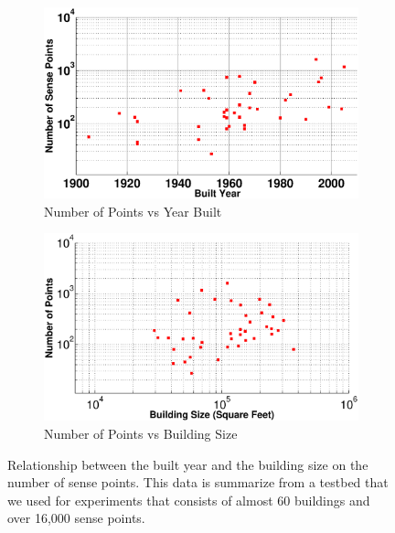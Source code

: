 \begin{figure}[htb!]
\centering
	\begin{subfigure}{0.48\textwidth}
                \centering
		\includegraphics[width=\textwidth]{./figs/pts_vs_yearbuilt.eps}
                \caption{Number of Points vs Year Built}
                \label{fig:sense_pts_data_yb}
	\end{subfigure}
	\begin{subfigure}{0.48\textwidth}
                \centering
		\includegraphics[width=\textwidth]{./figs/pts_vs_buildsz.eps}
                \caption{Number of Points vs Building Size}
                \label{fig:sense_pts_data_bs}
	\end{subfigure}
\caption{Relationship between the built year and the building size on the number of sense
points.  This data is summarize from a testbed that we used for experiments that consists of
almost 60 buildings and over 16,000 sense points.}
\label{fig:sense_pts_data}
\end{figure}

